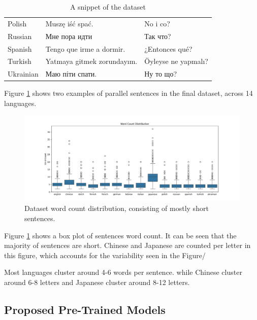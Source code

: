 \documentclass[a4paper]{article}
\begin{document}
\begin{CJK}{UTF8}{gbsn}
\begin{table}[htbp]
\begin{tabular}{|l|l|l|}
            Polish            & Muszę iść spać.                       & No i co?                              \\
            Russian           & Мне пора идти                         & Так что?                              \\
            Spanish           & Tengo que irme a dormir.              & ¿Entonces qué?                        \\
            Turkish           & Yatmaya gitmek zorundayım.            & Öyleyse ne yapmalı?                   \\
            Ukrainian         & Маю піти спати.                       & Ну то що?                             \\
            \hline
        \end{tabular}
        \caption{A snippet of the dataset}
        \label{table:parallel_sentence}
    \end{table}
\end{CJK}

Figure \ref{table:parallel_sentence} shows two examples of parallel sentences in the final dataset, across 14 languages.

\begin{figure}[htbp]
    \centering
    \includegraphics[width=1\linewidth]{figures/word_count_box.png}
    \caption{Dataset word count distribution, consisting of mostly short sentences.}
    \label{fig:word_count_box}
\end{figure}

Figure \ref{fig:word_count_box} shows a box plot of sentences word count. It can be seen that the majority of sentences are short. Chinese and Japanese are counted per letter in this figure, which accounts for the variability seen in the Figure/

Most languages cluster around 4-6 words per sentence. while Chinese cluster around 6-8 letters and Japanese cluster around 8-12 letters.

\subsection{Proposed Pre-Trained Models}
\end{document}
